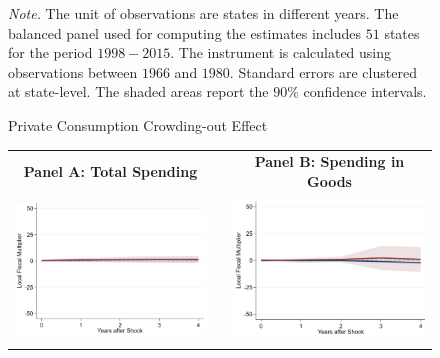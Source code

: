 \documentclass[dv_diss_main.tex]{subfiles}
\begin{document}
\begin{figure}[ht]
\begin{center}
\begin{tabular}[c]{ccc}
    
    \end{tabular}
    \end{center}
    
    
    \caption{Private Consumption Crowding-out Effect}
    
    \footnotesize{\textit{Note. } The unit of observations are states in different years. The balanced panel used for computing the estimates includes $51$ states for the period $1998-2015$. The instrument is calculated using observations between $1966$ and $1980$. Standard errors are clustered at state-level. The shaded areas report the $90\%$ confidence intervals.}

    \label{fig:crowd_privcons}
\end{figure}
\newpage

\begin{figure}[ht]
    \begin{center}
        \begin{tabular}[c]{ccc}
    
    \normalsize{\bf Panel A: Total Spending} & & \normalsize{\bf Panel B: Spending in Goods} \\
    {\includegraphics[height=1.5in,width=2.8in]{figures/graph_mpc_ms.png}} & & {\includegraphics[height=1.5in,width=2.8in]{figures/graph_mpc_goods.png}} \\[0.1in]
    

\end{tabular}
\end{center}
\end{figure}
\end{document}

